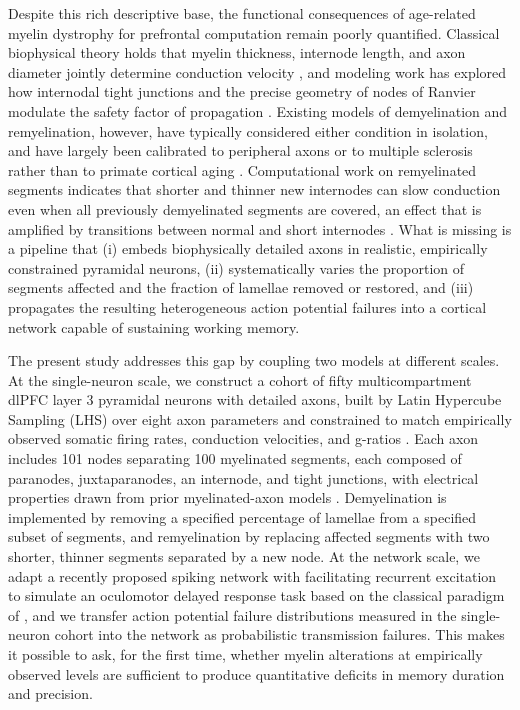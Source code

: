 Despite this rich descriptive base, the functional consequences of age-related myelin dystrophy for prefrontal computation remain poorly quantified. Classical biophysical theory holds that myelin thickness, internode length, and axon diameter jointly determine conduction velocity \citep{waxman1980determinants}, and modeling work has explored how internodal tight junctions and the precise geometry of nodes of Ranvier modulate the safety factor of propagation \citep{devaux2008tight,smith2024nodal}. Existing models of demyelination and remyelination, however, have typically considered either condition in isolation, and have largely been calibrated to peripheral axons or to multiple sclerosis rather than to primate cortical aging \citep{stephanova2003extracellular,coggan2015demyelination,naud2019demyelination}. Computational work on remyelinated segments indicates that shorter and thinner new internodes can slow conduction even when all previously demyelinated segments are covered, an effect that is amplified by transitions between normal and short internodes \citep{lasiene2008partial,powers2012remyelination,scurfield2018internodal}. What is missing is a pipeline that (i) embeds biophysically detailed axons in realistic, empirically constrained pyramidal neurons, (ii) systematically varies the proportion of segments affected and the fraction of lamellae removed or restored, and (iii) propagates the resulting heterogeneous action potential failures into a cortical network capable of sustaining working memory.

The present study addresses this gap by coupling two models at different scales. At the single-neuron scale, we construct a cohort of fifty multicompartment dlPFC layer 3 pyramidal neurons with detailed axons, built by Latin Hypercube Sampling (LHS) over eight axon parameters and constrained to match empirically observed somatic firing rates, conduction velocities, and g-ratios \citep{rumbell2016automated,coskren2015aging}. Each axon includes 101 nodes separating 100 myelinated segments, each composed of paranodes, juxtaparanodes, an internode, and tight junctions, with electrical properties drawn from prior myelinated-axon models \citep{devaux2008tight,scurfield2018internodal}. Demyelination is implemented by removing a specified percentage of lamellae from a specified subset of segments, and remyelination by replacing affected segments with two shorter, thinner segments separated by a new node. At the network scale, we adapt a recently proposed spiking network with facilitating recurrent excitation \citep{hansel2013short} to simulate an oculomotor delayed response task based on the classical paradigm of \citet{funahashi1989mnemonic}, and we transfer action potential failure distributions measured in the single-neuron cohort into the network as probabilistic transmission failures. This makes it possible to ask, for the first time, whether myelin alterations at empirically observed levels are sufficient to produce quantitative deficits in memory duration and precision.

